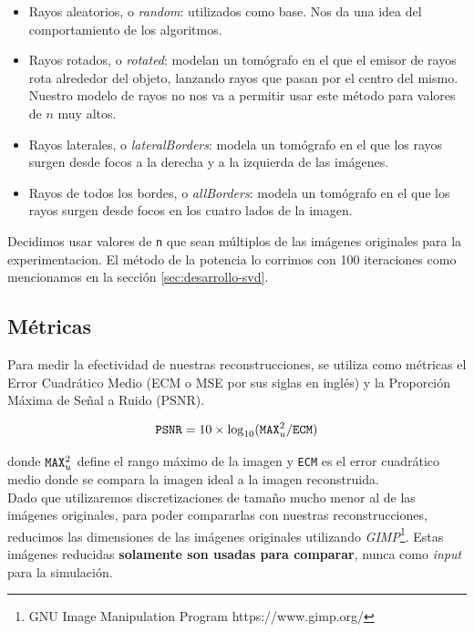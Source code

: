 \begin{itemize}
	\item Rayos aleatorios, o \textit{random}: utilizados como base.
		Nos da una idea del comportamiento de los algoritmos.
	\item Rayos rotados, o \textit{rotated}: modelan un tomógrafo en el que el emisor de rayos
		rota alrededor del objeto, lanzando rayos que pasan por el centro del mismo. Nuestro modelo de rayos no nos va a permitir usar este método para valores de $n$ muy altos.
	\item Rayos laterales, o \textit{lateralBorders}: modela un tomógrafo en el que los rayos surgen
		desde focos a la derecha y a la izquierda de las imágenes.
	\item Rayos de todos los bordes, o \textit{allBorders}: modela un tomógrafo en el que los rayos surgen
		desde focos en los cuatro lados de la imagen.
\end{itemize}

Decidimos usar valores de \verb|n| que sean múltiplos de las imágenes originales para la experimentacion. El método de la potencia lo corrimos con 100 iteraciones como mencionamos en la sección \ref{sec:desarrollo-svd}.


\subsection{Métricas}
\label{sec:exp-metrics}

Para medir la efectividad de nuestras reconstrucciones,
se utiliza como métricas el Error Cuadrático Medio (ECM o MSE por sus siglas en inglés)
y la Proporción Máxima de Señal a Ruido (PSNR).

\begin{equation*}
   \verb|PSNR| = 10 \times \log_{10}(\verb|MAX|^2_{u}/\verb|ECM|)
\end{equation*}

donde $\verb|MAX|^2_{u}$ define el rango máximo de la imagen y \verb|ECM| es el error cuadrático medio donde se compara la imagen ideal a la imagen reconstruida.\\


Dado que utilizaremos discretizaciones de tamaño mucho menor al de las imágenes originales,
para poder compararlas con nuestras reconstrucciones,
reducimos las dimensiones de las imágenes originales utilizando \textit{GIMP}\footnote{GNU Image Manipulation Program https://www.gimp.org/}.
Estas imágenes reducidas \textbf{solamente son usadas para comparar},
nunca como \textit{input} para la simulación.

